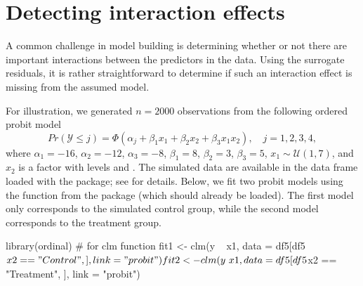 \section{Detecting interaction effects}

A common challenge in model building is determining whether or not there are important interactions between the predictors in the data. Using the surrogate residuals, it is rather straightforward to determine if such an interaction effect is missing from the assumed model.

For illustration, we generated $n = 2000$ observations from the following ordered probit model
\begin{equation*}
  Pr\left(\mathcal{Y} \le j\right) = \Phi\left(\alpha_j + \beta_1 x_1 + \beta_2 x_2 + \beta_3 x_1 x_2\right), \quad j = 1, 2, 3, 4,
\end{equation*}
where $\alpha_1 = -16$, $\alpha_2 = -12$, $\alpha_3 = -8$, $\beta_1 = 8$, $\beta_2 = 3$, $\beta_3 = 5$, $x_1 \sim \mathcal{U}\left(1, 7\right)$, and $x_2$ is a factor with levels  and . The simulated data are available in the  data frame loaded with the  package; see  for details. Below, we fit two probit models using the  function from the  package (which should already be loaded). The first model only corresponds to the simulated control group, while the second model corresponds to the treatment group.
\begin{example}
library(ordinal)  # for clm function
fit1 <- clm(y ~ x1, data = df5[df5$x2 == "Control", ], link = "probit")
fit2 <- clm(y ~ x1, data = df5[df5$x2 == "Treatment", ], link = "probit")
\end{example}

